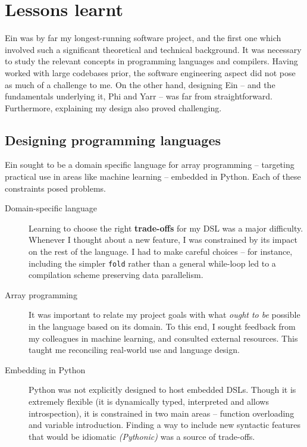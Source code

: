 \needspace{2em}
\section{Lessons learnt}

Ein was by far my longest-running software project, and the first one which involved such a significant theoretical and technical background. 
It was necessary to study the relevant concepts in programming languages and compilers.
Having worked with large codebases prior, the software engineering aspect did not pose as much of a challenge to me. 
On the other hand, designing Ein -- and the fundamentals underlying it, Phi and Yarr -- was far from straightforward. 
Furthermore, explaining my design also proved challenging. 

\subsection{Designing programming languages}

Ein sought to be a domain specific language for array programming -- targeting practical use in areas like machine learning -- embedded in Python. Each of these constraints posed problems.

\begin{description}
    \item[Domain-specific language] 
    Learning to choose the right \textbf{trade-offs} for my DSL was a major difficulty. 
    Whenever I thought about a new feature, I was constrained by its impact on the rest of the language. 
    I had to make careful choices -- for instance, including the simpler \texttt{fold} rather than a general while-loop led to a compilation scheme preserving data parallelism.
    \item[Array programming] 
    It was important to relate my project goals with what \textit{ought to be} possible in the language based on its domain. 
    To this end, I sought feedback from my colleagues in machine learning, and consulted external resources.
    This taught me reconciling real-world use and language design.
    \item[Embedding in Python] 
    Python was not explicitly designed to host embedded DSLs. 
    Though it is extremely flexible (it is dynamically typed, interpreted and allows introspection), it is constrained in two main areas -- function overloading and variable introduction. 
    Finding a way to include new syntactic features that would be idiomatic \textit{(Pythonic)} was a source of trade-offs.
\end{description}

